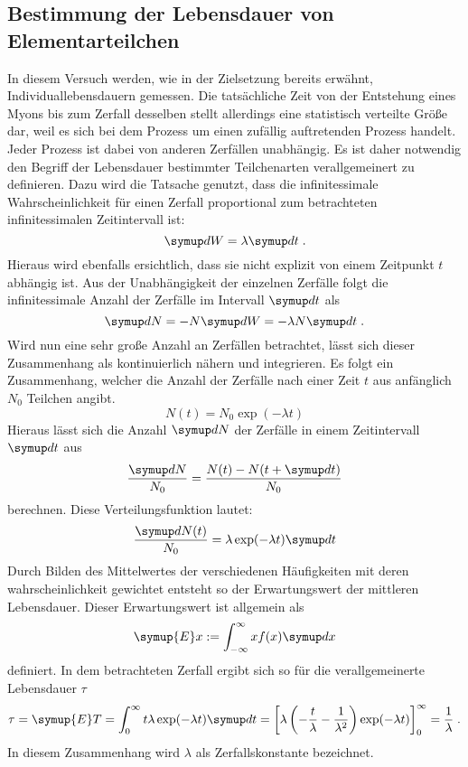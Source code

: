 \subsection{Bestimmung der Lebensdauer von Elementarteilchen}

In diesem Versuch werden, wie in der Zielsetzung bereits erwähnt, Individuallebensdauern gemessen. Die tatsächliche Zeit
von der Entstehung eines Myons bis zum Zerfall desselben stellt allerdings eine statistisch verteilte Größe dar, weil es
sich bei dem Prozess um einen zufällig auftretenden Prozess handelt. Jeder Prozess ist dabei von anderen Zerfällen
unabhängig. Es ist daher notwendig den Begriff der Lebensdauer bestimmter Teilchenarten verallgemeinert zu definieren.
Dazu wird die Tatsache genutzt, dass die infinitessimale Wahrscheinlichkeit für einen Zerfall proportional zum
betrachteten infinitessimalen Zeitintervall ist:
%
\begin{equation}
  \upd W=\lambda\upd t \; .
\end{equation}
%
Hieraus wird ebenfalls ersichtlich, dass sie nicht explizit von einem Zeitpunkt $t$ abhängig ist. Aus der Unabhängigkeit
der einzelnen Zerfälle folgt die infinitessimale Anzahl der Zerfälle im Intervall $\upd t$ als
%
\begin{equation}
  \upd N=-N\upd W=-\lambda N\upd t \; .
\end{equation}
%
Wird nun eine sehr große Anzahl an Zerfällen betrachtet, lässt sich dieser Zusammenhang als kontinuierlich nähern und
integrieren. Es folgt ein Zusammenhang, welcher die Anzahl der Zerfälle nach einer Zeit $t$ aus anfänglich $N_0$
Teilchen angibt.
%
\begin{equation}
  N(t)=N_0\exp(-\lambda t)
\end{equation}
%
Hieraus lässt sich die Anzahl $\upd N$ der Zerfälle in einem Zeitintervall $\upd t$ aus
%
\begin{equation}
  \frac{\upd N}{N_0}=\frac{N(t)-N(t+\upd t)}{N_0}
\end{equation}
%
berechnen. Diese Verteilungsfunktion lautet:
%
\begin{equation}
  \frac{\upd N(t)}{N_0}=\lambda\exp(-\lambda t)\upd t
\end{equation}
%
Durch Bilden des Mittelwertes der verschiedenen Häufigkeiten mit deren wahrscheinlichkeit gewichtet entsteht so der
Erwartungswert der mittleren Lebensdauer. Dieser Erwartungswert ist allgemein als
%
\begin{equation}
  \symup{E}x:=\int_{-\infty}^{\infty}xf(x)\upd x
\end{equation}
%
definiert. In dem betrachteten Zerfall ergibt sich so für die verallgemeinerte Lebensdauer $\tau$
%
\begin{equation}
  \tau=\symup{E}T=\int_0^\infty t\lambda\exp(-\lambda t)\upd t=\left[\lambda\left(-\frac{t}{\lambda}-\frac{1}{\lambda^2}\right)\exp(-\lambda t)\right]^\infty_0=\frac{1}{\lambda} \; .
\end{equation}
%
In diesem Zusammenhang wird $\lambda$ als Zerfallskonstante bezeichnet.
